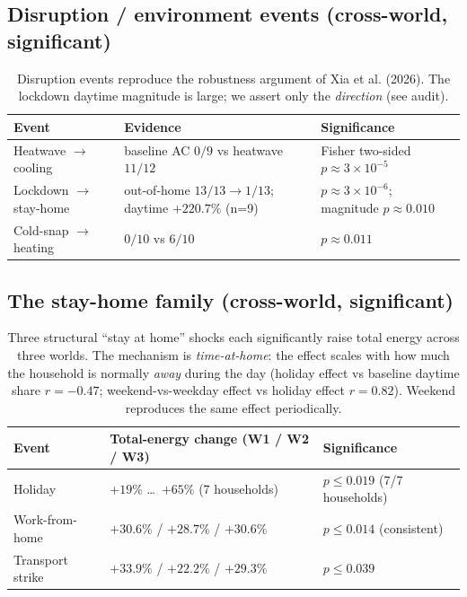 \documentclass[11pt]{article}
\begin{document}
\subsection{Disruption / environment events (cross-world, significant)}
\begin{table}[h]
\centering
\small
\begin{tabular}{lll}
\hline
\textbf{Event} & \textbf{Evidence} & \textbf{Significance} \\
\hline
Heatwave $\rightarrow$ cooling & baseline AC $0/9$ vs heatwave $11/12$ & Fisher two-sided $p\approx 3\times10^{-5}$ \\
Lockdown $\rightarrow$ stay-home & out-of-home $13/13\rightarrow 1/13$; daytime $+220.7\%$ (n=9) & $p\approx 3\times10^{-6}$; magnitude $p\approx 0.010$ \\
Cold-snap $\rightarrow$ heating & $0/10$ vs $6/10$ & $p\approx 0.011$ \\
\hline
\end{tabular}
\caption{Disruption events reproduce the robustness argument of Xia et al. (2026). The lockdown daytime
magnitude is large; we assert only the \emph{direction} (see audit).}
\end{table}

\subsection{The stay-home family (cross-world, significant)}
\begin{table}[h]
\centering
\small
\begin{tabular}{lll}
\hline
\textbf{Event} & \textbf{Total-energy change (W1 / W2 / W3)} & \textbf{Significance} \\
\hline
Holiday & $+19\%$ \ldots\ $+65\%$ (7 households) & $p\le 0.019$ (7/7 households) \\
Work-from-home & $+30.6\%$ / $+28.7\%$ / $+30.6\%$ & $p\le 0.014$ (consistent) \\
Transport strike & $+33.9\%$ / $+22.2\%$ / $+29.3\%$ & $p\le 0.039$ \\
\hline
\end{tabular}
\caption{Three structural ``stay at home'' shocks each significantly raise total energy across three
worlds. The mechanism is \emph{time-at-home}: the effect scales with how much the household is normally
\emph{away} during the day (holiday effect vs baseline daytime share $r=-0.47$; weekend-vs-weekday effect
vs holiday effect $r=0.82$). Weekend reproduces the same effect periodically.}
\end{table}
\end{document}
